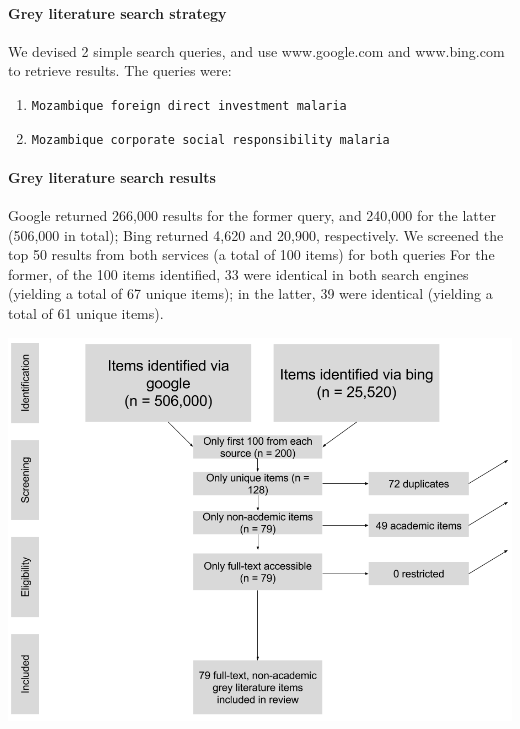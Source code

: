 \documentclass[]{elsarticle} %
\providecommand{\tightlist}{%
  \setlength{\itemsep}{0pt}\setlength{\parskip}{0pt}}
\begin{document}
\paragraph{Grey literature search
strategy}\label{grey-literature-search-strategy}

We devised 2 simple search queries, and use www.google.com and
www.bing.com to retrieve results. The queries were:

\begin{enumerate}
\def\labelenumi{\arabic{enumi}.}
\tightlist
\item
  \texttt{Mozambique\ foreign\ direct\ investment\ malaria}
\item
  \texttt{Mozambique\ corporate\ social\ responsibility\ malaria}
\end{enumerate}

\paragraph{Grey literature search
results}\label{grey-literature-search-results}

Google returned 266,000 results for the former query, and 240,000 for
the latter (506,000 in total); Bing returned 4,620 and 20,900,
respectively. We screened the top 50 results from both services (a total
of 100 items) for both queries For the former, of the 100 items
identified, 33 were identical in both search engines (yielding a total
of 67 unique items); in the latter, 39 were identical (yielding a total
of 61 unique items).

\begin{center}
\includegraphics[width=400pt]{img/prisma_grey.png}
\end{center}
\end{document}
